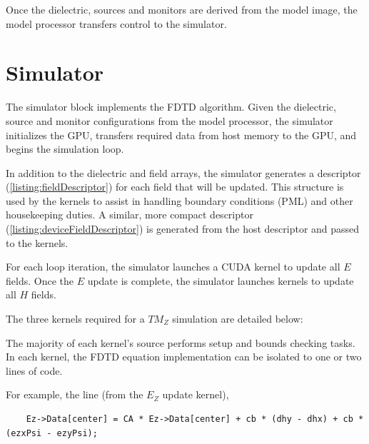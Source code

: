\label{listing:modelFromImage}

Once the dielectric, sources and monitors are derived from the model image, the model processor transfers control to the simulator.

\section{Simulator}\label{sec:simulator}

The simulator block implements the FDTD algorithm. Given the dielectric, source and monitor configurations from the model processor, the simulator initializes the GPU, transfers required data from host memory to the GPU, and begins the simulation loop.

In addition to the dielectric and field arrays, the simulator generates a  descriptor (\autoref{listing:fieldDescriptor}) for each field that will be updated. This structure is used by the kernels to assist in handling boundary conditions (PML) and other housekeeping duties. A similar, more compact  descriptor (\autoref{listing:deviceFieldDescriptor}) is generated from the host descriptor and passed to the kernels.

\label{listing:fieldDescriptor}

\label{listing:deviceFieldDescriptor}

For each loop iteration, the simulator launches a CUDA kernel to update all $E$ fields. Once the $E$ update is complete, the simulator launches kernels to update all $H$ fields.

The three kernels required for a $TM_Z$ simulation are detailed below:

\label{listing:updateEzCpp}

The majority of each kernel's source performs setup and bounds checking tasks. In each kernel, the FDTD equation implementation can be isolated to one or two lines of code.

For example, the line (from the $E_Z$ update kernel),

\begin{lstlisting}
	Ez->Data[center] = CA * Ez->Data[center] + cb * (dhy - dhx) + cb * (ezxPsi - ezyPsi);
\end{lstlisting}

